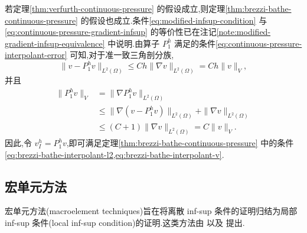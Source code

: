 \begin{note}[定理 3.94 推出定理 3.96]\label{note:verfurth-implies-brezzi-bathe}
若定理\ref{thm:verfurth-continuous-pressure} 的假设成立,则定理\ref{thm:brezzi-bathe-continuous-pressure} 的假设也成立.条件\cref{eq:modified-infsup-condition} 与\cref{eq:continuous-pressure-gradient-infsup} 的等价性已在注记\ref{note:modified-gradient-infsup-equivalence} 中说明.由算子 $P_1^h$ 满足的条件\cref{eq:continuous-pressure-interpolant-error} 可知,对于准一致三角剖分族,
\[
  \|v-P_1^h v\|_{L^2(\Omega)}
  \le Ch\|\nabla v\|_{L^2(\Omega)}
  =Ch\|v\|_V,
\]
并且
\[
\begin{aligned}
  \|P_1^h v\|_V
  &=\|\nabla P_1^h v\|_{L^2(\Omega)}\\
  &\le \|\nabla(v-P_1^h v)\|_{L^2(\Omega)}
       +\|\nabla v\|_{L^2(\Omega)}\\
  &\le (C+1)\|\nabla v\|_{L^2(\Omega)}
   =C\|v\|_V.
\end{aligned}
\]
因此,令 $v_I^h=P_1^h v$,即可满足定理\ref{thm:brezzi-bathe-continuous-pressure} 中的条件\cref{eq:brezzi-bathe-interpolant-l2,eq:brezzi-bathe-interpolant-v}.
\end{note}

\subsection{宏单元方法}\label{subsec:macroelement-techniques}

\begin{note}[目标]\label{note:macroelement-goal}
宏单元方法(macroelement techniques)旨在将离散 inf-sup 条件的证明归结为局部 inf-sup 条件(local inf-sup condition)的证明.这类方法由\textcite{BolandNicolaides1983} 以及\textcite{Stenberg1984,Stenberg1987,Stenberg1990} 提出.
\end{note}

